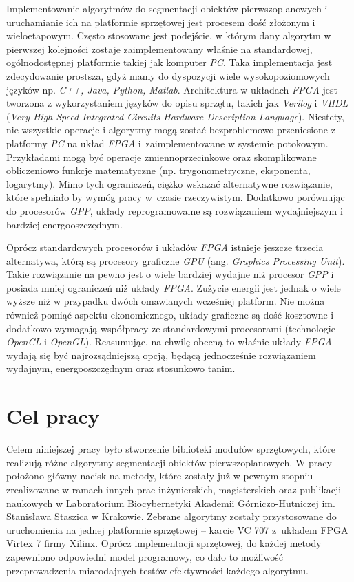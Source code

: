 Implementowanie algorytmów do segmentacji obiektów pierwszoplanowych i uruchamianie ich na platformie sprzętowej jest procesem dość złożonym i wieloetapowym. 
Często stosowane jest podejście, w którym dany algorytm w pierwszej kolejności zostaje zaimplementowany właśnie na standardowej, ogólnodostępnej platformie takiej jak komputer \textit{PC}. 
Taka implementacja jest zdecydowanie prostsza, gdyż mamy do dyspozycji wiele wysokopoziomowych języków np. \textit{C++, Java, Python, Matlab}. 
Architektura w układach \textit{FPGA} jest tworzona z wykorzystaniem języków do opisu sprzętu, takich jak \textit{Verilog} i \textit{VHDL} (\textit{Very High Speed Integrated Circuits Hardware Description Language}). 
Niestety, nie wszystkie operacje i algorytmy mogą zostać bezproblemowo przeniesione z platformy \textit{PC} na układ \textit{FPGA} i~zaimplementowane w systemie potokowym. 
Przykładami mogą być operacje zmiennoprzecinkowe oraz skomplikowane obliczeniowo funkcje matematyczne (np. trygonometryczne, eksponenta, logarytmy). 
Mimo tych ograniczeń, ciężko wskazać alternatywne rozwiązanie, które spełniało by wymóg pracy w~czasie rzeczywistym. 
Dodatkowo porównując do procesorów \textit{GPP}, układy reprogramowalne są rozwiązaniem wydajniejszym i bardziej energooszczędnym.

Oprócz standardowych procesorów i układów \textit{FPGA} istnieje jeszcze trzecia alternatywa, którą są procesory graficzne \textit{GPU} (ang. \textit{Graphics Processing Unit}). 
Takie rozwiązanie na pewno jest o wiele bardziej wydajne niż procesor \textit{GPP} i posiada mniej ograniczeń niż układy \textit{FPGA}. 
Zużycie energii jest jednak o wiele wyższe niż w przypadku dwóch omawianych wcześniej platform. 
Nie można również pomiąć aspektu ekonomicznego, układy graficzne są dość kosztowne i dodatkowo wymagają współpracy ze standardowymi procesorami (technologie \textit{OpenCL} i \textit{OpenGL}). 
Reasumując, na chwilę obecną to właśnie układy \textit{FPGA} wydają się być najrozsądniejszą opcją, będącą jednocześnie rozwiązaniem wydajnym, energooszczędnym oraz stosunkowo tanim. 


\section{Cel pracy}
\label{sec:wprowadzenie_cel_pracy}

Celem niniejszej pracy było stworzenie biblioteki modułów sprzętowych, które realizują różne algorytmy segmentacji obiektów pierwszoplanowych. 
W pracy położono główny nacisk na metody, które zostały już w pewnym stopniu zrealizowane w ramach innych prac inżynierskich, magisterskich oraz publikacji naukowych w Laboratorium Biocybernetyki Akademii Górniczo-Hutniczej im. Stanisława Staszica w Krakowie.
Zebrane algorytmy zostały przystosowane do uruchomienia na jednej platformie sprzętowej -- karcie VC 707 z~układem FPGA Virtex 7 firmy Xilinx.
Oprócz implementacji sprzętowej, do każdej metody zapewniono odpowiedni model programowy, co dało to możliwość przeprowadzenia miarodajnych testów efektywności każdego algorytmu.

